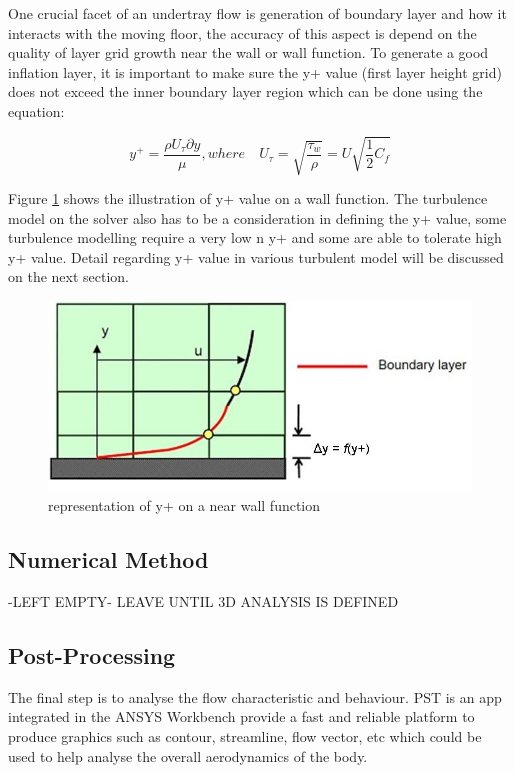 \noindent One crucial facet of an undertray flow is generation of boundary layer and how it interacts with the moving floor, the accuracy of this aspect is depend on the quality of layer grid growth near the wall or wall function. To generate a good inflation layer, it is important to make sure the y+ value (first layer height grid) does not exceed the inner boundary layer region which can be done using the equation:

\begin{equation}
    y^+ = \frac{\rho U_\tau \partial y}{\mu}, where \quad U_\tau = \sqrt{\frac{\tau_w}{\rho}} = U \sqrt{\frac{1}{2}C_f}
\end{equation}

\noindent Figure \ref{fig:inflation layer} shows the illustration of y+ value on a wall function. The turbulence model on the solver also has to be a consideration in defining the y+ value, some turbulence modelling require a very low n y+ and some are able to tolerate high y+ value. Detail regarding y+ value in various turbulent model will be discussed on the next section. 

\begin{figure}[!ht]
    \centering
    \includegraphics{Figures/inflation_layer.jpg}
    \caption{representation of y+ on a near wall function \cite{Anonymous2013Inflate4Blog}}
    \label{fig:inflation layer}
\end{figure}



\subsection{Numerical Method}
-LEFT EMPTY-
LEAVE UNTIL 3D ANALYSIS IS DEFINED

\subsection{Post-Processing}
The final step is to analyse the flow characteristic and behaviour. PST is an app integrated in the ANSYS Workbench provide a fast and reliable platform to produce graphics such as contour, streamline, flow vector, etc which could be used to help analyse the overall aerodynamics of the body. 

